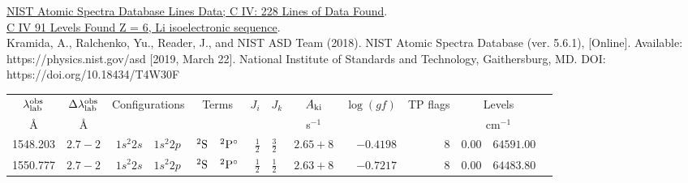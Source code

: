 \documentclass[a4paper,fleqn,usenatbib]{mnras}
\begin{document}
\href{https://physics.nist.gov/cgi-bin/ASD/lines1.pl?spectra=C+IV&limits_type=0&low_w=&upp_w=&unit=1&submit=Retrieve+Data&de=0&format=0&line_out=0&en_unit=0&output=0&bibrefs=1&page_size=15&show_obs_wl=1&show_calc_wl=1&unc_out=1&order_out=0&max_low_enrg=&show_av=2&max_upp_enrg=&tsb_value=0&min_str=&A_out=0&intens_out=on&max_str=&allowed_out=1&forbid_out=1&min_accur=&min_intens=&conf_out=on&term_out=on&enrg_out=on&J_out=on}{NIST Atomic Spectra Database Lines Data; C IV: 228 Lines of Data Found}. \\

\href{https://physics.nist.gov/cgi-bin/ASD/energy1.pl?encodedlist=XXT2&de=0&spectrum=C+IV&submit=Retrieve+Data&units=0&format=0&output=0&page_size=15&multiplet_ordered=0&conf_out=on&term_out=on&level_out=on&unc_out=1&j_out=on&lande_out=on&perc_out=on&biblio=on&temp=}{C IV   91 Levels Found
Z = 6, Li isoelectronic sequence}. \\

Kramida, A., Ralchenko, Yu., Reader, J., and NIST ASD Team (2018). NIST Atomic Spectra Database (ver. 5.6.1), [Online]. Available: https://physics.nist.gov/asd [2019, March 22]. National Institute of Standards and Technology, Gaithersburg, MD. DOI: https://doi.org/10.18434/T4W30F 






\begin{table*}
\begin{tabular}{rrr@{ -- }lr@{ -- }lr@{ -- }llrrr@{ -- }rl}
\hline
\multicolumn{1}{c}{$\lambda_{\rm lab}^{\rm obs}$} & \multicolumn{1}{c}{$\Delta\lambda_{\rm lab}^{\rm obs}$} & \multicolumn{2}{c}{Configurations} & \multicolumn{2}{c}{Terms} & $J_i$ & $J_k$ & \multicolumn{1}{c}{$A_{\rm ki}$} & \multicolumn{1}{c}{$\log(gf)$} & TP flags & \multicolumn{2}{c}{Levels}  \\
\multicolumn{1}{c}{\AA } & \multicolumn{1}{c}{\AA} & \multicolumn{2}{c}{} & \multicolumn{2}{c}{} & \multicolumn{2}{c}{} & \multicolumn{1}{c}{s$^{-1}$} & & & \multicolumn{2}{c}{cm$^{-1}$} & \\
\hline
   1548.203  & $2.7-2$ &  $1s^{2}2s$ & $1s^{2}2p$  &       $^{2}{\rm S}$ & $^{2}{\rm P}^\circ$ &  $\frac{1}{2}$ & $\frac{3}{2}$  & $2.65+8$ & $ -0.4198$ &     8 &      $0.00$ &  $64591.00$  \\
   1550.777  & $2.7-2$ &  $1s^{2}2s$ & $1s^{2}2p$  &       $^{2}{\rm S}$ & $^{2}{\rm P}^\circ$ &  $\frac{1}{2}$ & $\frac{1}{2}$  & $2.63+8$ & $ -0.7217$ &     8 &      $0.00$ &  $64483.80$  \\
\hline
\end{tabular}
\label{tab:civ_configs}
\end{table*}
\end{document}
